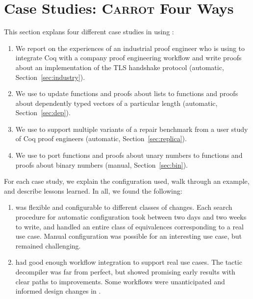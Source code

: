 \section{Case Studies: \textsc{Carrot} Four Ways}
\label{sec:search}

This section explans four different case studies in using \toolname:

\begin{enumerate}
\item We report on the experiences of an industrial proof engineer who is using \toolname to integrate Coq with a company proof engineering workflow and write proofs about an implementation of the TLS handshake protocol (automatic, Section~\ref{sec:industry}).
\item We use \toolname to update functions and proofs about lists to functions and proofs about dependently typed vectors of
a particular length (automatic, Section~\ref{sec:dep}).
\item We use \toolname to support multiple variants of a repair benchmark from a user study of Coq proof engineers (automatic, Section~\ref{sec:replica}).
\item We use \toolname to port functions and proofs about unary numbers to functions and proofs about binary numbers (manual, Section~\ref{sec:bin}).
\end{enumerate}
For each case study, we explain the configuration used, walk through an example, and describe lessons learned.
In all, we found the following:

\begin{enumerate}
\item \toolname was flexible and configurable to different classes of changes. Each search procedure for automatic configuration
took between two days and two weeks to write, and handled an entire class of equivalences corresponding to a real use case.
Manual configuration was possible for an interesting use case, but remained challenging.
\item \toolname had good enough workflow integration to support real use cases.
The tactic decompiler was far from perfect, but showed promising early results with clear paths to improvements.
Some workflows were unanticipated and informed design changes in \toolname.
\end{enumerate}


